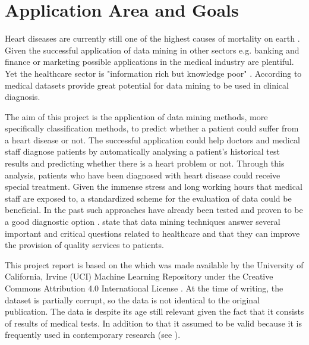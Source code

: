 \section{Application Area and Goals} \label{sec:applicationAreaGoals}

Heart diseases are currently still one of the highest causes of mortality on earth \citep{nahar2013, kavitha2016, statistischesbundesamt2020}.
Given the successful application of data mining in other sectors e.g. banking and finance or marketing \citep{keles2017} possible applications in the medical industry are plentiful. Yet the healthcare sector is "information rich but knowledge poor" \citep{soni2011}. According to \citet{soni2011} medical datasets provide great potential for data mining to be used in clinical diagnosis.


The aim of this project is the application of data mining methods, more specifically classification methods, to predict whether a patient could suffer from a heart disease or not. The successful application could help doctors and medical staff diagnose patients by automatically analysing a patient's historical test results and predicting whether there is a heart problem or not. Through this analysis, patients who have been diagnosed with heart disease could receive special treatment. Given the immense stress and long working hours that medical staff are exposed to, a standardized scheme for the evaluation of data could be beneficial. 
In the past such approaches have already been tested and proven to be a good diagnostic option \citep{usharani2011}. \citet{jabbar2013} state that data mining techniques answer several important and critical questions related to healthcare and that they can improve the provision of quality services to patients.

This project report is based on the  \citep{janosi1988} which was made available by the University of California, Irvine (UCI) Machine Learning Repository under the Creative Commons Attribution 4.0 International License \citep{janosi1988}. At the time of writing, the dataset is partially corrupt, so the data is not identical to the original publication. The data is despite its age still relevant given the fact that it consists of results of medical tests. In addition to that it assumed to be valid because it is frequently used in contemporary research (see \cite{usharani2011, aha1988, nahar2013}). 
